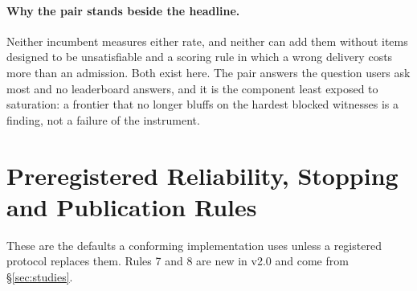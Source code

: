 \documentclass[11pt]{article}
\theoremstyle{definition}
\begin{document}
\paragraph{Why the pair stands beside the headline.} Neither incumbent measures either rate, and neither can add them without items designed to be unsatisfiable and a scoring rule in which a wrong delivery costs more than an admission. Both exist here. The pair answers the question users ask most and no leaderboard answers, and it is the component least exposed to saturation: a frontier that no longer bluffs on the hardest blocked witnesses is a finding, not a failure of the instrument.

\section{Preregistered Reliability, Stopping and Publication Rules}\label{sec:reliability}

These are the defaults a conforming implementation uses unless a registered protocol replaces them. Rules 7 and 8 are new in v2.0 and come from \S\ref{sec:studies}.
\end{document}
